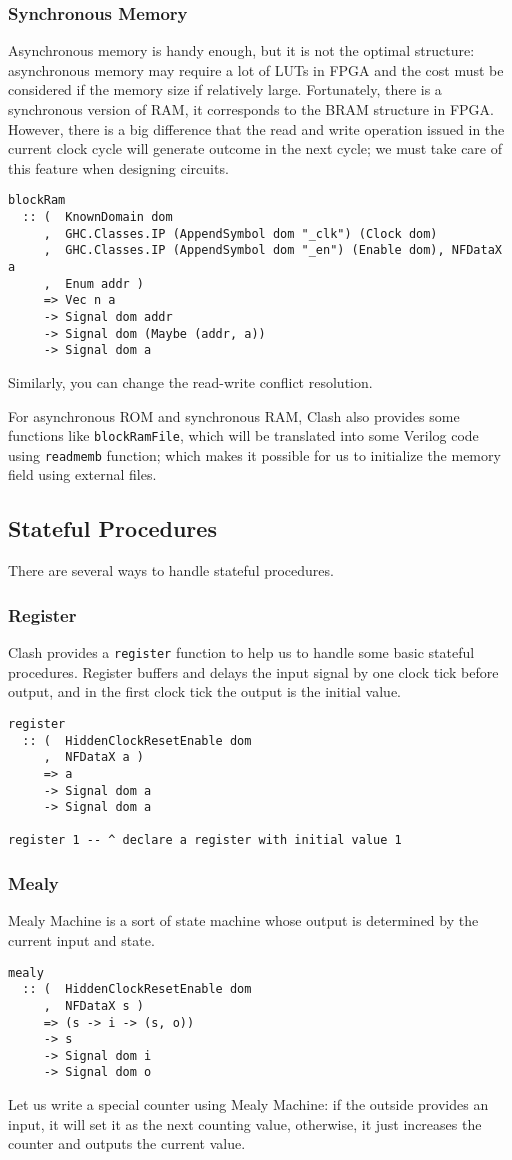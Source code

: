 \subsubsection{Synchronous Memory}
Asynchronous memory is handy enough, but it is not the optimal structure: asynchronous memory may require a lot of LUTs in FPGA and the cost must be considered if the memory size if relatively large. Fortunately, there is a synchronous version of RAM, it corresponds to the BRAM structure in FPGA. However, there is a big difference that the read and write operation issued in the current clock cycle will generate outcome in the next cycle; we must take care of this feature when designing circuits.
\begin{verbatim}
blockRam
  :: (  KnownDomain dom
     ,  GHC.Classes.IP (AppendSymbol dom "_clk") (Clock dom)
     ,  GHC.Classes.IP (AppendSymbol dom "_en") (Enable dom), NFDataX a
     ,  Enum addr ) 
     => Vec n a
     -> Signal dom addr 
     -> Signal dom (Maybe (addr, a)) 
     -> Signal dom a
\end{verbatim}

Similarly, you can change the read-write conflict resolution. 

For asynchronous ROM and synchronous RAM, Clash also provides some functions like \texttt{blockRamFile}, which will be translated into some Verilog code using \texttt{readmemb} function; which makes it possible for us to initialize the memory field using external files.

\subsection{Stateful Procedures}
There are several ways to handle stateful procedures.
\subsubsection{Register}
Clash provides a \texttt{register} function to help us to handle some basic stateful procedures. Register buffers and delays the input signal by one clock tick before output, and in the first clock tick the output is the initial value.
\begin{verbatim}
register
  :: (  HiddenClockResetEnable dom
     ,  NFDataX a ) 
     => a 
     -> Signal dom a 
     -> Signal dom a

register 1 -- ^ declare a register with initial value 1
\end{verbatim}
\subsubsection{Mealy}
Mealy Machine is a sort of state machine whose output is determined by the current input and state.
\begin{verbatim}
mealy
  :: (  HiddenClockResetEnable dom
     ,  NFDataX s ) 
     => (s -> i -> (s, o)) 
     -> s 
     -> Signal dom i 
     -> Signal dom o
\end{verbatim}
Let us write a special counter using Mealy Machine: if the outside provides an input, it will set it as the next counting value, otherwise, it just increases the counter and outputs the current value.

